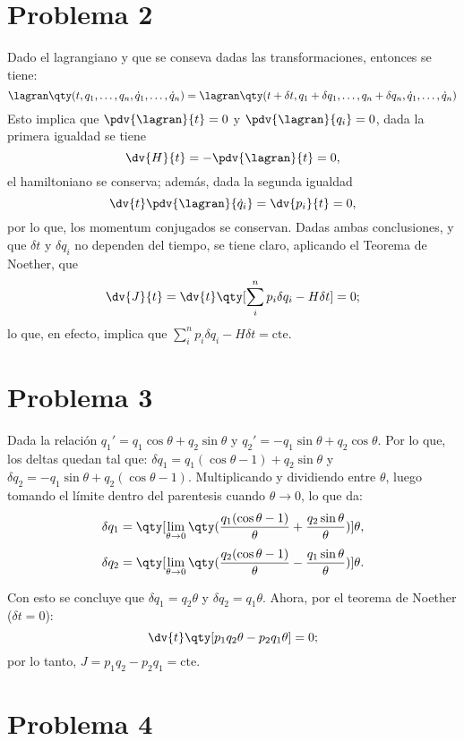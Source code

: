 \section{Problema 2}
Dado el lagrangiano y que se conseva dadas las transformaciones, entonces se tiene:
\begin{displaymath}
	\lagran \qty(t,q_1,\ldots ,q_n ,\dot{q}_1, \ldots ,\dot{q}_n) = \lagran \qty(t + \delta t,q_1 + \delta q_1,\ldots ,q_n + \delta q_n ,\dot{q}_1, \ldots ,\dot{q}_n)
\end{displaymath}
Esto implica que $\pdv{\lagran}{t} = 0$ y $\pdv{\lagran}{q_i} = 0$, dada la primera igualdad se tiene
	$$\dv{H}{t} = -\pdv{\lagran}{t} = 0,$$
el hamiltoniano se conserva; además, dada la segunda igualdad
	$$\dv{t} \pdv{\lagran}{\dot{q}_i} = \dv{p_i}{t} = 0,$$
por lo que, los momentum conjugados se conservan. Dadas ambas conclusiones, y que $\delta t$ y $\delta q_i$ no dependen del tiempo, se tiene claro, aplicando el Teorema de Noether, que
	$$\dv{J}{t} = \dv{t} \qty[\sum_i ^n p_i \delta q_i - H\delta t] = 0;$$
lo que, en efecto, implica que $\displaystyle\sum_i ^n p_i \delta q_i - H\delta t = \text{cte}$. 


\section{Problema 3}
Dada la relación $q_1 ' = q_1 \cos{\theta} + q_2 \sin{\theta}$ y $q_2 ' = -q_1 \sin{\theta} + q_2 \cos{\theta}$. Por lo que, los deltas quedan tal que: $\delta q_1 = q_1 (\cos{\theta} - 1) + q_2 \sin{\theta}$ y $\delta q_2 = -q_1 \sin{\theta} + q_2 (\cos{\theta} - 1)$. Multiplicando y dividiendo entre $\theta$, luego tomando el límite dentro del parentesis cuando $\theta \to 0$, lo que da:
	$$\delta q_1 = \qty[\lim_{\theta \to 0} \qty(\frac{q_1 (\cos{\theta} - 1)}{\theta} + \frac{q_2 \sin{\theta}}{\theta})] \theta ,$$
	$$\delta q_2 = \qty[\lim_{\theta \to 0} \qty(\frac{q_2 (\cos{\theta} - 1)}{\theta} - \frac{q_1 \sin{\theta}}{\theta})] \theta.$$

Con esto se concluye que $\delta q_1 = q_2 \theta$ y $\delta q_2 = q_1 \theta$. Ahora, por el teorema de Noether ($\delta t = 0$):
	$$\dv{t} \qty[p_1 q_2 \theta - p_2 q_1 \theta] = 0;$$
por lo tanto, $J = p_1 q_2 - p_2 q_1 = \text{cte}.$


\section{Problema 4}






























